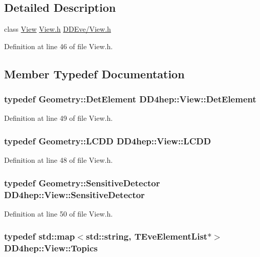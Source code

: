 \subsection{Detailed Description}
class \hyperlink{class_d_d4hep_1_1_view}{View} \hyperlink{_view_8h}{View.h} \hyperlink{_view_8h}{DDEve/View.h} 

Definition at line 46 of file View.h.

\subsection{Member Typedef Documentation}
\hypertarget{class_d_d4hep_1_1_view_a59eafc8150df21b918b964850ac6c462}{
\subsubsection[{DetElement}]{\setlength{\rightskip}{0pt plus 5cm}typedef {\bf Geometry::DetElement} {\bf DD4hep::View::DetElement}}}
\label{class_d_d4hep_1_1_view_a59eafc8150df21b918b964850ac6c462}


Definition at line 49 of file View.h.\hypertarget{class_d_d4hep_1_1_view_ac08032a73da302ae36cd3c7b07b83864}{
\subsubsection[{LCDD}]{\setlength{\rightskip}{0pt plus 5cm}typedef {\bf Geometry::LCDD} {\bf DD4hep::View::LCDD}}}
\label{class_d_d4hep_1_1_view_ac08032a73da302ae36cd3c7b07b83864}


Definition at line 48 of file View.h.\hypertarget{class_d_d4hep_1_1_view_ad8426310f6488c879c008001eb20289e}{
\subsubsection[{SensitiveDetector}]{\setlength{\rightskip}{0pt plus 5cm}typedef {\bf Geometry::SensitiveDetector} {\bf DD4hep::View::SensitiveDetector}}}
\label{class_d_d4hep_1_1_view_ad8426310f6488c879c008001eb20289e}


Definition at line 50 of file View.h.\hypertarget{class_d_d4hep_1_1_view_aac8510a8567e5e9128020fd81d8f57de}{
\subsubsection[{Topics}]{\setlength{\rightskip}{0pt plus 5cm}typedef std::map$<$std::string, {\bf TEveElementList}$\ast$$>$ {\bf DD4hep::View::Topics}}}
\label{class_d_d4hep_1_1_view_aac8510a8567e5e9128020fd81d8f57de}


